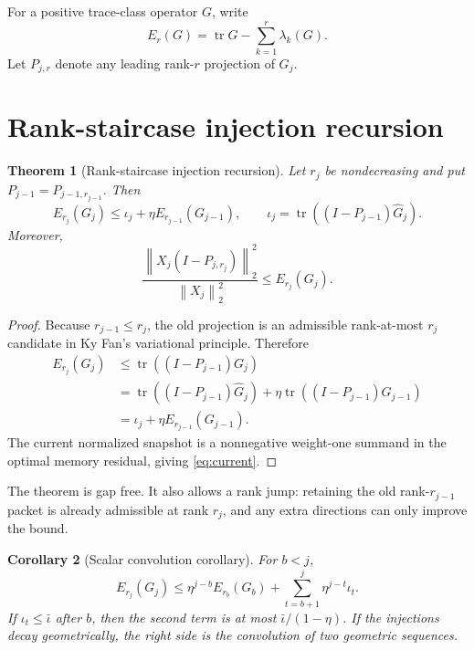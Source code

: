 \documentclass[11pt]{article}
\newtheorem{theorem}{Theorem}[section]
\newtheorem{corollary}[theorem]{Corollary}
\theoremstyle{remark}
\newcommand{\norm}[1]{\left\lVert#1\right\rVert}
\begin{document}
For a positive trace-class operator $G$, write
\[
 E_r(G)=\operatorname{tr}G-\sum_{k=1}^r\lambda_k(G).
\]
Let $P_{j,r}$ denote any leading rank-$r$ projection of $G_j$.

\section{Rank-staircase injection recursion}

\begin{theorem}[Rank-staircase injection recursion]
\label{thm:recursion}
Let $r_j$ be nondecreasing and put $P_{j-1}=P_{j-1,r_{j-1}}$.  Then
\begin{equation}
 \boxed{
 E_{r_j}(G_j)\le \iota_j+\eta E_{r_{j-1}}(G_{j-1}),
 \qquad
 \iota_j=\operatorname{tr}((I-P_{j-1})\widehat G_j).}
 \label{eq:recursion}
\end{equation}
Moreover,
\begin{equation}
 \frac{\norm{X_j(I-P_{j,r_j})}_2^2}{\norm{X_j}_2^2}
 \le E_{r_j}(G_j).
 \label{eq:current}
\end{equation}
\end{theorem}

\begin{proof}
Because $r_{j-1}\le r_j$, the old projection is an admissible rank-at-most
$r_j$ candidate in Ky Fan's variational principle.  Therefore
\begin{align*}
 E_{r_j}(G_j)
 &\le\operatorname{tr}((I-P_{j-1})G_j)\\
 &=\operatorname{tr}((I-P_{j-1})\widehat G_j)
 +\eta\operatorname{tr}((I-P_{j-1})G_{j-1})\\
 &=\iota_j+\eta E_{r_{j-1}}(G_{j-1}).
\end{align*}
The current normalized snapshot is a nonnegative weight-one summand in the
optimal memory residual, giving \eqref{eq:current}.
\end{proof}

The theorem is gap free.  It also allows a rank jump: retaining the old
rank-$r_{j-1}$ packet is already admissible at rank $r_j$, and any extra
directions can only improve the bound.

\begin{corollary}[Scalar convolution corollary]
\label{cor:convolution}
For $b<j$,
\begin{equation}
 E_{r_j}(G_j)
 \le \eta^{j-b}E_{r_b}(G_b)
 +\sum_{t=b+1}^j\eta^{j-t}\iota_t.
 \label{eq:convolution}
\end{equation}
If $\iota_t\le\bar\iota$ after $b$, then the second term is at most
$\bar\iota/(1-\eta)$.  If the injections decay geometrically, the right side
is the convolution of two geometric sequences.
\end{corollary}
\end{document}
